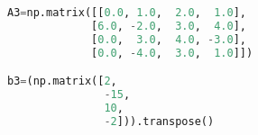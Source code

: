 \begin{lstlisting}[language=Python, style=jupycolors]
A3=np.matrix([[0.0, 1.0,  2.0,  1.0],
             [6.0, -2.0,  3.0,  4.0],
             [0.0,  3.0,  4.0, -3.0],
             [0.0, -4.0,  3.0,  1.0]])

b3=(np.matrix([2,
               -15,
               10,
               -2])).transpose()

\end{lstlisting}
